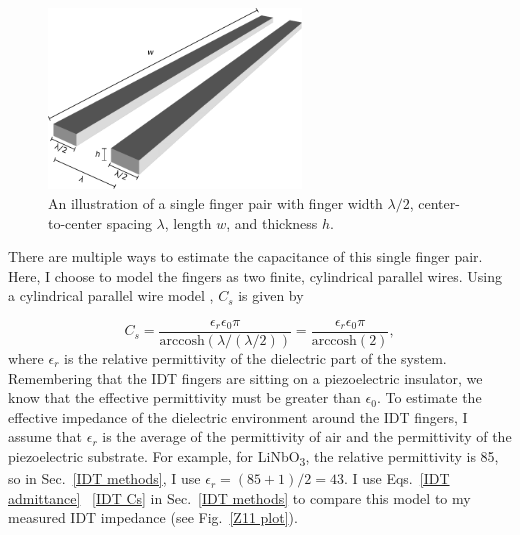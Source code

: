 \documentclass{beavtex_dub_edit}
\begin{document}
\begin{figure}
    \includegraphics[width = 0.6\textwidth]{IDT capacitance toy model_3d.pdf}
    \caption{An illustration of a single finger pair with finger width $\lambda/2$, center-to-center spacing $\lambda$, length $w$, and thickness $h$.}
    \label{IDT capacitance toy model}
\end{figure}
There are multiple ways to estimate the capacitance of this single finger pair. Here, I choose to model the fingers as two finite, cylindrical parallel wires. Using a cylindrical parallel wire model \cite[p.\ 682]{lonngren_fundamentals_2007}, $C_s$ is given by 

\begin{equation}
    C_s = \frac{\epsilon_r \epsilon_0 \pi}{\mathrm{arccosh}(\lambda/(\lambda/2))} = \frac{\epsilon_r \epsilon_0 \pi}{\mathrm{arccosh}(2)},
    \label{IDT Cs}
\end{equation}
where $\epsilon_r$ is the relative permittivity of the dielectric part of the system. Remembering that the IDT fingers are sitting on a piezoelectric insulator, we know that the effective permittivity must be greater than $\epsilon_0$. To estimate the effective impedance of the dielectric environment around the IDT fingers, I assume that $\epsilon_r$ is the average of the permittivity of air and the permittivity of the piezoelectric substrate. For example, for LiNbO\textsubscript{3}, the relative permittivity is 85, so in Sec.\ \ref{IDT methods}, I use $\epsilon_r = (85 + 1)/2 = 43$. I use Eqs.\ \ref{IDT admittance} \textendash\ \ref{IDT Cs} in Sec.\ \ref{IDT methods} to compare this model to my measured IDT impedance (see Fig.\ \ref{Z11 plot}).
\end{document}
